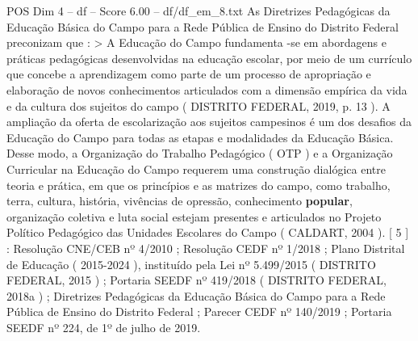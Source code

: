 \begin{textsample}{POS Dim 4 – df – Score 6.00 – df/df\_em\_8.txt}
As Diretrizes Pedagógicas da Educação Básica do Campo para a Rede Pública de Ensino do Distrito Federal preconizam que : > A Educação do Campo fundamenta -se em abordagens e práticas pedagógicas desenvolvidas na educação escolar, por meio de um currículo que concebe a aprendizagem como parte de um processo de apropriação e elaboração de novos conhecimentos articulados com a dimensão empírica da vida e da cultura dos sujeitos do campo ( DISTRITO FEDERAL, 2019, p. 13 ).
A ampliação da oferta de escolarização aos sujeitos campesinos é um dos desafios da Educação do Campo para todas as etapas e modalidades da Educação Básica.
Desse modo, a Organização do Trabalho Pedagógico ( OTP ) e a Organização Curricular na Educação do Campo requerem uma construção dialógica entre teoria e prática, em que os princípios e as matrizes do campo, como trabalho, terra, cultura, história, vivências de opressão, conhecimento \textbf{popular}, organização coletiva e luta social estejam presentes e articulados no Projeto Político Pedagógico das Unidades Escolares do Campo ( CALDART, 2004 ). [ 5 ] : Resolução CNE/CEB nº 4/2010 ; Resolução CEDF nº 1/2018 ; Plano Distrital de Educação ( 2015-2024 ), instituído pela Lei nº 5.499/2015 ( DISTRITO FEDERAL, 2015 ) ; Portaria SEEDF nº 419/2018 ( DISTRITO FEDERAL, 2018a ) ; Diretrizes Pedagógicas da Educação Básica do Campo para a Rede Pública de Ensino do Distrito Federal ; Parecer CEDF nº 140/2019 ; Portaria SEEDF nº 224, de 1º de julho de 2019.

\end{textsample}
